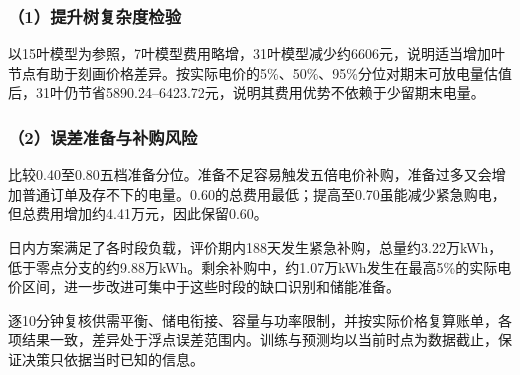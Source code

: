 \subsubsection*{（1）提升树复杂度检验}

以15叶模型为参照，7叶模型费用略增，31叶模型减少约6606元，说明适当增加叶节点有助于刻画价格差异。按实际电价的5\%、50\%、95\%分位对期末可放电量估值后，31叶仍节省5890.24--6423.72元，说明其费用优势不依赖于少留期末电量。

\subsubsection*{（2）误差准备与补购风险}

比较0.40至0.80五档准备分位。准备不足容易触发五倍电价补购，准备过多又会增加普通订单及存不下的电量。0.60的总费用最低；提高至0.70虽能减少紧急购电，但总费用增加约4.41万元，因此保留0.60。

日内方案满足了各时段负载，评价期内188天发生紧急补购，总量约3.22万kWh，低于零点分支的约9.88万kWh。剩余补购中，约1.07万kWh发生在最高5\%的实际电价区间，进一步改进可集中于这些时段的缺口识别和储能准备。

逐10分钟复核供需平衡、储电衔接、容量与功率限制，并按实际价格复算账单，各项结果一致，差异处于浮点误差范围内。训练与预测均以当前时点为数据截止，保证决策只依据当时已知的信息。
